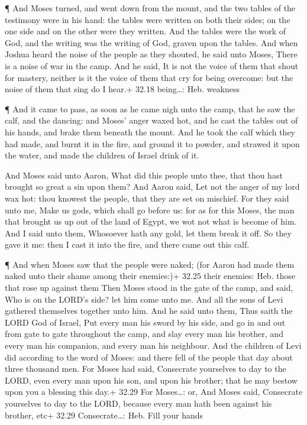  ¶ And Moses turned, and went down from the mount, and the
two tables of the testimony were in his hand: the tables were written on
both their sides; on the one side and on the other were they written.
 And the tables were the work of God, and the writing was
the writing of God, graven upon the tables.  And when
Joshua heard the noise of the people as they shouted, he said unto
Moses, There is a noise of war in the camp.  And he said,
It is not the voice of them that shout for mastery, neither is it the
voice of them that cry for being overcome: but the noise of them that
sing do I hear.+ 32.18 being\ldots: Heb. weakness

 ¶ And it came to pass, as soon as he came nigh unto the
camp, that he saw the calf, and the dancing: and Moses' anger waxed hot,
and he cast the tables out of his hands, and brake them beneath the
mount.  And he took the calf which they had made, and burnt
it in the fire, and ground it to powder, and strawed it upon the water,
and made the children of Israel drink of it.

 And Moses said unto Aaron, What did this people unto thee,
that thou hast brought so great a sin upon them?  And Aaron
said, Let not the anger of my lord wax hot: thou knowest the people,
that they are set on mischief.  For they said unto me, Make
us gods, which shall go before us: for as for this Moses, the man that
brought us up out of the land of Egypt, we wot not what is become of
him.  And I said unto them, Whosoever hath any gold, let
them break it off. So they gave it me: then I cast it into the fire, and
there came out this calf.

 ¶ And when Moses saw that the people were naked; (for
Aaron had made them naked unto their shame among their enemies:)+ 32.25
their enemies: Heb. those that rose up against them  Then
Moses stood in the gate of the camp, and said, Who is on the LORD's
side? let him come unto me. And all the sons of Levi gathered themselves
together unto him.  And he said unto them, Thus saith the
LORD God of Israel, Put every man his sword by his side, and go in and
out from gate to gate throughout the camp, and slay every man his
brother, and every man his companion, and every man his neighbour.
 And the children of Levi did according to the word of
Moses: and there fell of the people that day about three thousand men.
 For Moses had said, Consecrate yourselves to day to the
LORD, even every man upon his son, and upon his brother; that he may
bestow upon you a blessing this day.+ 32.29 For Moses\ldots: or, And
Moses said, Consecrate yourselves to day to the LORD, because every man
hath been against his brother, etc+ 32.29 Consecrate\ldots: Heb. Fill
your hands

